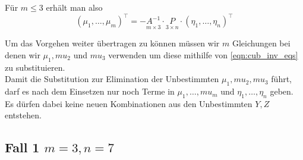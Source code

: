 \documentclass[a4paper,twoside, 11pt]{book}
\theoremstyle{custom}
\theoremstyle{custom}
\begin{document}
	Für $m \leq 3$ erhält man also 
	\begin{equation}\label{eqn:cub_inv_eqs}
		\left(\mu_1,\ldots,\mu_m\right)^{\intercal} = -\underset{\scriptscriptstyle m\times 3}{A^{-1}}\cdot \underset{\scriptscriptstyle 3\times n}{P} \cdot \left(\eta_1,\ldots,\eta_n\right)^{\intercal}
	\end{equation}
	
	Um das Vorgehen weiter übertragen zu können müssen wir $m$ Gleichungen bei denen wir $\mu_1, mu_2$ und $mu_3$ verwenden um diese mithilfe von \eqref{eqn:cub_inv_eqs} zu substituieren.\\
	Damit die Substitution zur Elimination der Unbestimmten $\mu_1, mu_2, mu_3$ führt, darf es nach dem Einsetzen nur noch Terme in $\mu_1, \ldots, mu_m$ und $\eta_1,\ldots,\eta_n$ geben. Es dürfen dabei keine neuen Kombinationen aus den Unbestimmten $Y,Z$ entstehen.
	
	\subsection{Fall 1 $m=3, n=7$}
	\newpage
	\pagestyle{plain}
	\nocite{*}
	
\end{document}
